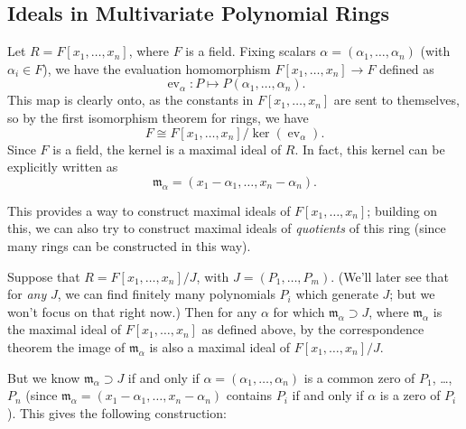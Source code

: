 \subsection{Ideals in Multivariate Polynomial Rings}


\vspace{0.75em}

\begin{example}
    Let $R = F[x_1, \ldots, x_n]$, where $F$ is a field. Fixing scalars $\alpha = (\alpha_1, \ldots, \alpha_n)$ (with $\alpha_i \in F$), we have the evaluation homomorphism $F[x_1, \ldots, x_n] \to F$ defined as \[\operatorname{ev}_\alpha : P \mapsto P(\alpha_1, \ldots, \alpha_n).\] This map is clearly onto, as the constants in $F[x_1, \ldots, x_n]$ are sent to themselves, so by the first isomorphism theorem for rings, we have \[F \cong F[x_1, \ldots, x_n]/\ker(\operatorname{ev}_\alpha).\] Since $F$ is a field, the kernel is a maximal ideal of $R$. In fact, this kernel can be explicitly written as \[\mathfrak{m}_\alpha = (x_1 - \alpha_1, \ldots, x_n - \alpha_n).\]
\end{example}

This provides a way to construct maximal ideals of $F[x_1, \ldots, x_n]$; building on this, we can also try to construct maximal ideals of \emph{quotients} of this ring (since many rings can be constructed in this way). 

Suppose that $R = F[x_1, \ldots, x_n]/J$, with $J = (P_1, \ldots, P_m)$. (We'll later see that for \emph{any} $J$, we can find finitely many polynomials $P_i$ which generate $J$; but we won't focus on that right now.) Then for any $\alpha$ for which $\mathfrak{m}_\alpha \supset J$, where $\mathfrak{m}_\alpha$ is the maximal ideal of $F[x_1, \ldots, x_n]$ as defined above, by the correspondence theorem the image of $\mathfrak{m}_\alpha$ is also a maximal ideal of $F[x_1, \ldots, x_n]/J$. 

But we know $\mathfrak{m}_\alpha \supset J$ if and only if $\alpha = (\alpha_1, \ldots, \alpha_n)$ is a common zero of $P_1$, \ldots, $P_n$ (since $\mathfrak{m}_\alpha = (x_1 - \alpha_1, \ldots, x_n - \alpha_n)$ contains $P_i$ if and only if $\alpha$ is a zero of $P_i$). This gives the following construction:

